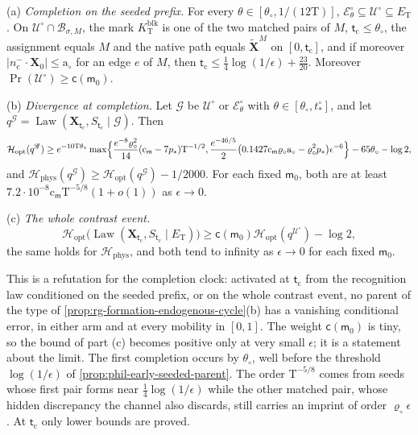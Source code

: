 (a) \emph{Completion on the seeded prefix.} For every
\(\theta\in[\theta_\circ,1/(12\mathrm T)]\),
\(\mathscr E^\circ_\theta\subseteq\mathscr U^\circ\subseteq E_{\mathrm T}\).
On \(\mathscr U^\circ\cap\mathscr B_{\sigma,M}\), the mark \(K^{\mathrm{blk}}_{\mathrm T}\)
is one of the two matched pairs of \(M\),
\(\mathsf t_{\mathrm c}\le\theta_\circ\), the assignment equals \(M\) and the
native path equals \(\widetilde{\mathbf X}^M\) on
\([0,\mathsf t_{\mathrm c}]\), and if moreover
\(|n^-_e\cdot\mathbf X_0|\le\mathrm a_\circ\) for an edge \(e\) of \(M\), then
\(\mathsf t_{\mathrm c}\le\frac14\log(1/\epsilon)+\frac{23}{20}\).
Moreover \(\Pr(\mathscr U^\circ)\ge\mathsf c(\mathsf m_0)\).

(b) \emph{Divergence at completion.} Let \(\mathscr G\) be
\(\mathscr U^\circ\) or \(\mathscr E^\circ_\theta\) with
\(\theta\in[\theta_\circ,t^\circ_*]\), and let
\(q^{\mathscr G}=\operatorname{Law}(\mathbf X_{\mathsf t_{\mathrm c}},
S_{\mathsf t_{\mathrm c}}\mid\mathscr G)\). Then
\[
 \mathcal H_{\mathrm{opt}}(q^{\mathscr G})\ge
 e^{-10\mathrm T\theta_\circ}\max\Bigl\{
 \frac{e^{-8}\varrho_\circ^2}{14}(\mathrm c_{\mathsf m}-7p_*)\mathrm T^{-1/2},
 \frac{e^{-46/5}}2\bigl(0.1427\mathrm c_{\mathsf m}\varrho_\circ\mathrm a_\circ
   -\varrho_\circ^2p_*\bigr)\epsilon^{-6}\Bigr\}
 -65\theta_\circ-\log2,
\]
and \(\mathcal H_{\mathrm{phys}}(q^{\mathscr G})\ge
\mathcal H_{\mathrm{opt}}(q^{\mathscr G})-1/2000\). For each fixed
\(\mathsf m_0\), both are at least
\(7.2\cdot10^{-8}\mathrm c_{\mathsf m}\mathrm T^{-5/8}(1+o(1))\) as
\(\epsilon\to0\).

(c) \emph{The whole contrast event.}
\[
 \mathcal H_{\mathrm{opt}}\bigl(\operatorname{Law}(\mathbf X_{\mathsf t_{\mathrm c}},
 S_{\mathsf t_{\mathrm c}}\mid E_{\mathrm T})\bigr)
 \ge\mathsf c(\mathsf m_0)\mathcal H_{\mathrm{opt}}(q^{\mathscr U^\circ})-\log2,
\]
the same holds for \(\mathcal H_{\mathrm{phys}}\), and both tend to infinity
as \(\epsilon\to0\) for each fixed \(\mathsf m_0\).

This is a refutation for the completion clock: activated at
\(\mathsf t_{\mathrm c}\) from the recognition law conditioned on the seeded
prefix, or on the whole contrast event, no parent of the type of
\cref{prop:rg-formation-endogenous-cycle}(b) has a vanishing conditional error,
in either arm and at every mobility in \([0,1]\). The weight
\(\mathsf c(\mathsf m_0)\) is tiny, so the bound of part (c) becomes positive only
at very small \(\epsilon\); it is a statement about the limit. The first
completion occurs by \(\theta_\circ\), well before the threshold
\(\log(1/\epsilon)\) of \cref{prop:phil-early-seeded-parent}. The order
\(\mathrm T^{-5/8}\) comes from seeds whose first pair forms near
\(\frac14\log(1/\epsilon)\) while the other matched pair, whose hidden
discrepancy the channel also discards, still carries an imprint of order
\(\varrho_\circ\epsilon\). At \(\mathsf t_{\mathrm c}\) only lower bounds are
proved.


